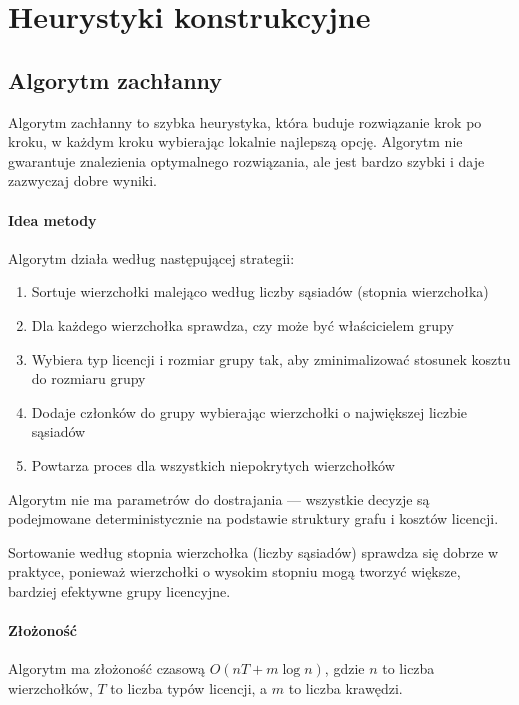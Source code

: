 \section{Heurystyki konstrukcyjne}

\subsection{Algorytm zachłanny}\label{subsec:greedy}

Algorytm zachłanny to szybka heurystyka, która buduje rozwiązanie krok po kroku, w każdym kroku wybierając lokalnie najlepszą opcję. Algorytm nie gwarantuje znalezienia optymalnego rozwiązania, ale jest bardzo szybki i daje zazwyczaj dobre wyniki.

\paragraph{Idea metody}
Algorytm działa według następującej strategii:
\begin{enumerate}
  \item Sortuje wierzchołki malejąco według liczby sąsiadów (stopnia wierzchołka)
  \item Dla każdego wierzchołka sprawdza, czy może być właścicielem grupy
  \item Wybiera typ licencji i rozmiar grupy tak, aby zminimalizować stosunek kosztu do rozmiaru grupy
  \item Dodaje członków do grupy wybierając wierzchołki o największej liczbie sąsiadów
  \item Powtarza proces dla wszystkich niepokrytych wierzchołków
\end{enumerate}

Algorytm nie ma parametrów do dostrajania — wszystkie decyzje są podejmowane deterministycznie na podstawie struktury grafu i kosztów licencji.

Sortowanie według stopnia wierzchołka (liczby sąsiadów) sprawdza się dobrze w praktyce, ponieważ wierzchołki o wysokim stopniu mogą tworzyć większe, bardziej efektywne grupy licencyjne.

\paragraph{Złożoność}
Algorytm ma złożoność czasową $O(nT + m\log n)$, gdzie $n$ to liczba wierzchołków, $T$ to liczba typów licencji, a $m$ to liczba krawędzi.

